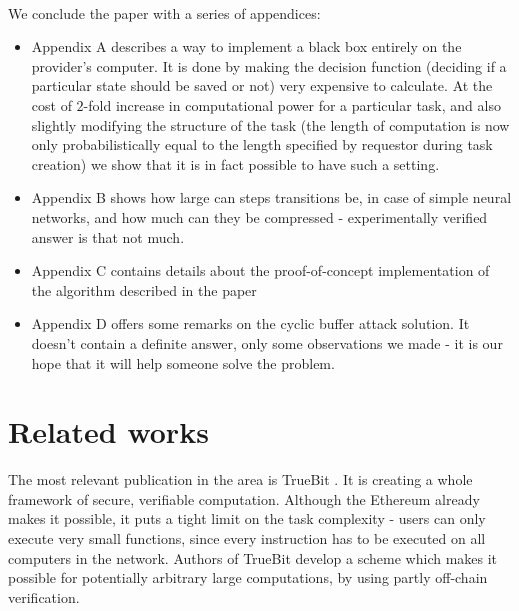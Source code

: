 \documentclass{winnower}
\begin{document}
\\
We conclude the paper with a series of appendices:
\begin{itemize}
 \item Appendix A describes a way to implement a black box entirely on the provider's computer. It is done by making the decision function (deciding if a particular state should be saved or not) very expensive to calculate. At the cost of $2$-fold increase in computational power for a particular task, and also slightly modifying the structure of the task (the length of computation is now only probabilistically equal to the length specified by requestor during task creation) we show that it is in fact possible to have such a setting.
 \item Appendix B shows how large can steps transitions be, in case of simple neural networks, and how much can they be compressed - experimentally verified answer is that not much.
 \item Appendix C contains details about the proof-of-concept implementation of the algorithm described in the paper
 \item Appendix D offers some remarks on the cyclic buffer attack solution. It doesn't contain a definite answer, only some observations we made - it is our hope that it will help someone solve the problem.


\end{itemize}
\section{Related works}

The most relevant publication in the area is TrueBit \citep{truebit}. It is creating a whole framework of secure, verifiable computation. Although the Ethereum \citep{ethereum} already makes it possible, it puts a tight limit on the task complexity - users can only execute very small functions, since every instruction has to be executed on all computers in the network. Authors of TrueBit develop a scheme which makes it possible for potentially arbitrary large computations, by using partly off-chain verification.
\end{document}
